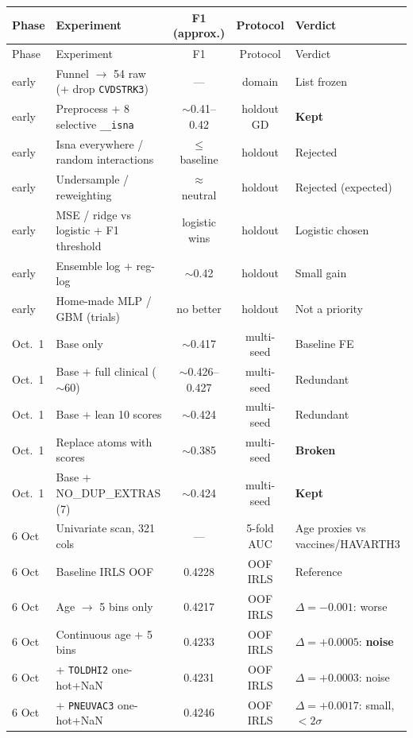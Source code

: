 \documentclass[11pt,a4paper]{article}
\begin{document}
\begin{longtable}{@{}p{2.4cm}p{5.0cm}ccp{3.8cm}@{}}
\toprule
Phase & Experiment & F1 (approx.) & Protocol & Verdict \\
\midrule
\endfirsthead
\toprule
Phase & Experiment & F1 & Protocol & Verdict \\
\midrule
\endhead

early & Funnel $\to$ 54 raw (+ drop \texttt{CVDSTRK3}) & --- & domain & List frozen \\
early & Preprocess + 8 selective \texttt{\_\_isna} & $\sim$0.41--0.42 & holdout GD & \textbf{Kept} \\
early & Isna everywhere / random interactions & $\leq$ baseline & holdout & Rejected \\
early & Undersample / reweighting & $\approx$ neutral & holdout & Rejected (expected) \\
early & MSE / ridge vs logistic + F1 threshold & logistic wins & holdout & Logistic chosen \\
early & Ensemble log + reg-log & $\sim$0.42 & holdout & Small gain \\
early & Home-made MLP / GBM (trials) & no better & holdout & Not a priority \\
Oct.\ 1 & Base only & $\sim$0.417 & multi-seed & Baseline FE \\
Oct.\ 1 & Base + full clinical ($\sim$60) & $\sim$0.426--0.427 & multi-seed & Redundant \\
Oct.\ 1 & Base + lean 10 scores & $\sim$0.424 & multi-seed & Redundant \\
Oct.\ 1 & Replace atoms with scores & $\sim$0.385 & multi-seed & \textbf{Broken} \\
Oct.\ 1 & Base + NO\_DUP\_EXTRAS (7) & $\sim$0.424 & multi-seed & \textbf{Kept} \\
6 Oct & Univariate scan, 321 cols & --- & 5-fold AUC & Age proxies vs vaccines/HAVARTH3 \\
6 Oct & Baseline IRLS OOF & 0.4228 & OOF IRLS & Reference \\
6 Oct & Age $\to$ 5 bins only & 0.4217 & OOF IRLS & $\Delta=-0.001$: worse \\
6 Oct & Continuous age + 5 bins & 0.4233 & OOF IRLS & $\Delta=+0.0005$: \textbf{noise} \\
6 Oct & + \texttt{TOLDHI2} one-hot+NaN & 0.4231 & OOF IRLS & $\Delta=+0.0003$: noise \\
6 Oct & + \texttt{PNEUVAC3} one-hot+NaN & 0.4246 & OOF IRLS & $\Delta=+0.0017$: small, $<2\sigma$ \\

\end{longtable}
\end{document}
